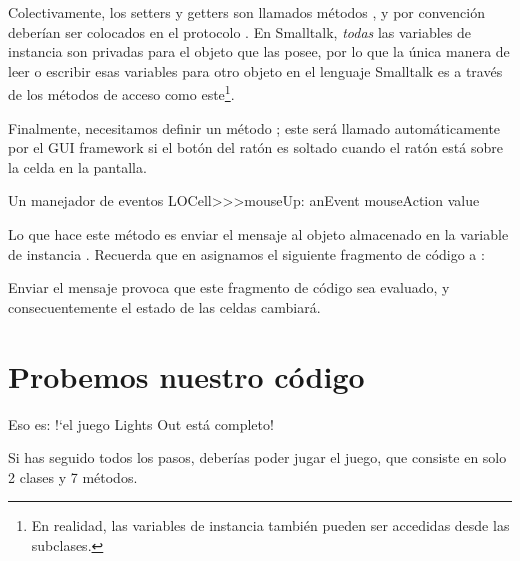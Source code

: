 \documentclass[a4paper,10pt,twoside]{book}
\begin{document}
Colectivamente, los setters y getters son llamados m\'etodos , y por convenci\'on deber\'ian ser colocados en el protocolo .
En Smalltalk, \emph{todas} las variables de instancia son privadas para el objeto que las posee, por lo que la \'unica manera de leer o escribir esas variables para otro objeto en el lenguaje Smalltalk es a trav\'es de los m\'etodos de acceso como este\footnote{En realidad, las variables de instancia tambi\'en pueden ser accedidas desde las subclases.}.


Finalmente, necesitamos definir un m\'etodo ; este ser\'a llamado autom\'aticamente por el GUI framework  si el bot\'on del rat\'on es soltado cuando el rat\'on est\'a sobre la celda en la pantalla.

\begin{method}[sbecellmouseup]{Un manejador de eventos}
LOCell>>>mouseUp: anEvent
   mouseAction value
\end{method}


Lo que hace este m\'etodo es enviar el mensaje  al objeto almacenado en la variable de instancia .
Recuerda que en  asignamos el siguiente fragmento de c\'odigo a :


\noindent
Enviar el mensaje  provoca que este fragmento de c\'odigo sea evaluado, y consecuentemente el estado de las celdas cambiar\'a. 

\section{Probemos nuestro c\'odigo}

Eso es: !`el juego Lights Out est\'a completo!

Si has seguido todos los pasos, deber\'ias poder jugar el juego, que consiste en solo 2 clases y 7 m\'etodos.

\end{document}
